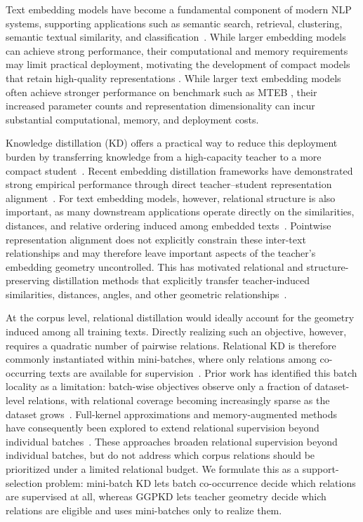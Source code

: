 Text embedding models have become a fundamental component of modern NLP systems, 
supporting applications such as semantic search, retrieval, clustering, semantic 
textual similarity, and classification~\citep{gao2023retrieval,muennighoff2023mteb}. 
While larger embedding models can achieve strong performance, their computational and memory requirements may limit practical deployment, motivating the development of compact models that retain high-quality representations \citep{zhang2025qwen3embedding}. While larger text embedding models often achieve stronger performance on benchmark such as MTEB \citep{muennighoff2023mteb}, their increased parameter counts and representation dimensionality can incur substantial computational, memory, and deployment costs.

Knowledge distillation (KD) offers a practical way to reduce this deployment burden by transferring knowledge from a high-capacity teacher to a more compact student~\citep{hinton2015distilling}. Recent embedding distillation frameworks have demonstrated strong empirical performance through direct teacher--student representation alignment~\citep{vujanic2026leaf}. For text embedding models, however, relational structure is also important, as many downstream applications operate directly on the similarities, distances, and relative ordering induced among embedded texts~\citep{reimers2019sentence,muennighoff2023mteb}. Pointwise representation alignment does not explicitly constrain these inter-text relationships and may therefore leave important aspects of the teacher's embedding geometry uncontrolled. This has motivated relational and structure-preserving distillation methods that explicitly transfer teacher-induced similarities, distances, angles, and other geometric relationships~\citep{tung2019similarity,park2019rkd,kim2023embeddistill,zhang2024jasperstella,dao2026talas}.

At the corpus level, relational distillation would ideally account for the geometry induced among all training texts. Directly realizing such an objective, however, requires a quadratic number of pairwise relations. Relational KD is therefore commonly instantiated within mini-batches, where only relations among co-occurring texts are available for supervision~\citep{tung2019similarity,park2019rkd,passalis2020pkt}. Prior work has identified this batch locality as a limitation: batch-wise objectives observe only a fraction of dataset-level relations, with relational coverage becoming increasingly sparse as the dataset grows~\citep{qian2022fullkernel,ckabert}. Full-kernel approximations and memory-augmented methods have consequently been explored to extend relational supervision beyond individual batches~\citep{qian2022fullkernel,ckabert,yang2022crossimage}. These approaches broaden relational supervision beyond individual batches, but do not address which corpus relations should be prioritized under a limited relational budget. We formulate this as a support-selection problem: mini-batch KD lets batch co-occurrence decide which relations are supervised at all, whereas GGPKD lets teacher geometry decide which relations are eligible and uses mini-batches only to realize them.

